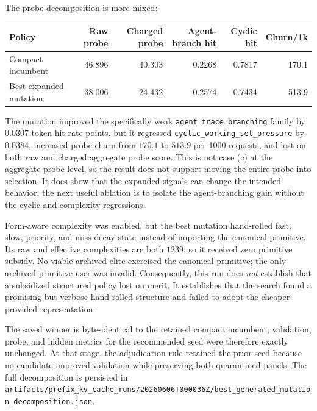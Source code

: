 \documentclass[11pt]{article}
\newcommand{\code}[1]{\texttt{\detokenize{#1}}}
\newcommand{\filepath}[1]{\nolinkurl{#1}}
\newcommand{\identifier}[1]{\nolinkurl{#1}}
\begin{document}
The probe decomposition is more mixed:

\begin{center}
\small
\begin{tabular}{lrrrrr}
\toprule
\textbf{Policy} & \textbf{Raw probe} & \textbf{Charged probe} &
\textbf{Agent-branch hit} & \textbf{Cyclic hit} & \textbf{Churn/1k} \\
\midrule
Compact incumbent & 46.896 & 40.303 & 0.2268 & 0.7817 & 170.1 \\
Best expanded mutation & 38.006 & 24.432 & 0.2574 & 0.7434 & 513.9 \\
\bottomrule
\end{tabular}
\end{center}

The mutation improved the specifically weak
\identifier{agent_trace_branching} family by \(0.0307\) token-hit-rate points, but it
regressed \identifier{cyclic_working_set_pressure} by \(0.0384\), increased probe
churn from \(170.1\) to \(513.9\) per 1000 requests, and lost on both raw and charged
aggregate probe score.  This is not case (c) at the aggregate-probe level, so the
result does not support moving the entire probe into selection.  It does show that the
expanded signals can change the intended behavior; the next useful ablation is to
isolate the agent-branching gain without the cyclic and complexity regressions.

Form-aware complexity was enabled, but the best mutation hand-rolled fast, slow,
priority, and miss-decay state instead of importing the canonical
\code{MultiTimescaleDecay} primitive.  Its raw and effective complexities are both
\(1239\), so it received zero primitive subsidy.  No viable archived elite exercised
the canonical primitive; the only archived primitive user was invalid.  Consequently,
this run does \emph{not} establish that a subsidized structured policy lost on merit.
It establishes that the search found a promising but verbose hand-rolled structure and
failed to adopt the cheaper provided representation.

The saved winner is byte-identical to the retained compact incumbent; validation, probe, and
hidden metrics for the recommended seed were therefore exactly unchanged.  At that
stage, the adjudication rule retained the prior seed because no candidate improved
validation while preserving both quarantined panels.  The full decomposition is
persisted in
\filepath{artifacts/prefix_kv_cache_runs/20260606T000036Z/best_generated_mutation_decomposition.json}.
\end{document}
